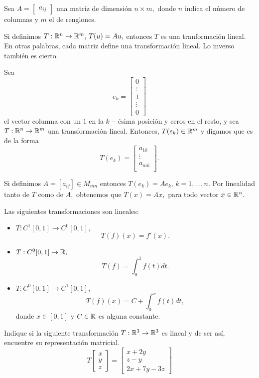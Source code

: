 \begin{resuelto}
\label{matriz:trans_lin}
Sea $A=\begin{bmatrix}
        a_{ij}
       \end{bmatrix}
$ una matriz de dimensi\'on $n \times m,$ donde $n$ indica el número  de columnas y $m$ el de renglones.

Si definimos $T:\mathbb{R}^{n}\to \mathbb{R}^{m}, \, T(u)=Au,$ entonces $T$ es una tranformaci\'on lineal. En otras palabras, cada
matriz define una transformaci\'on lineal. Lo inverso tambi\'en es cierto.

Sea $$e_{k}=\begin{bmatrix}
             0\\
             \vdots \\
             1 \\
             \vdots \\
             0
            \end{bmatrix}
$$
el vector columna con un $1$ en la $k-$\'esima posici\'on y ceros en el resto, y sea $T:\mathbb{R}^{n}\to \mathbb{R}^{m}$ una
transformaci\'on lineal. Entonces, $T(e_{k})\in \mathbb{R}^{m}$ y digamos que es de la forma
$$
T(e_{k})=\begin{bmatrix}
          a_{1k}\\
          \vdots \\
          a_{mk} \\
         \end{bmatrix}.
$$

Si definimos $A=[a_{ij}]\in M_{mn}$ entonces $T(e_{k})=Ae_{k}, \, k=1,...,n.$ Por linealidad tanto de $T$ como de $A,$
obtenemos que $T(x)=Ax,$ para todo vector $x\in \mathbb{R}^{n}.$
\end{resuelto}

\begin{resuelto}
Las siguientes transformaciones son lineales:
\begin{itemize}
 \item $T:C^{1}[0,1]\to C^{0}[0,1],$
 $$
T(f)(x)=f'(x).
 $$
 \item $T:C^{0}[0,1]\to \mathbb{R},$
$$
T(f)=\int_{0}^{1}f(t)dt.
$$
\item $T:C^{0}[0,1]\to C^{1}[0,1],$
$$
T(f)(x)=C+\int_{0}^{x}f(t)dt,
$$
donde $x\in[0,1]$ y $C\in \mathbb{R}$ es alguna constante.
\end{itemize}

\end{resuelto}

\begin{resuelto}
 Indique si la siguiente transformaci\'on $T:\mathbb{R}^{3}\to \mathbb{R}^{3}$ es lineal y de ser as\'i, encuentre su representaci\'on
matricial.
\[
\label{trans_exmp}
 T\begin{bmatrix}
    x\\y\\z
   \end{bmatrix}=
   \begin{bmatrix}
    x+2y \\ z-y\\ 2x+7y-3z
   \end{bmatrix}
\]

\end{resuelto}

